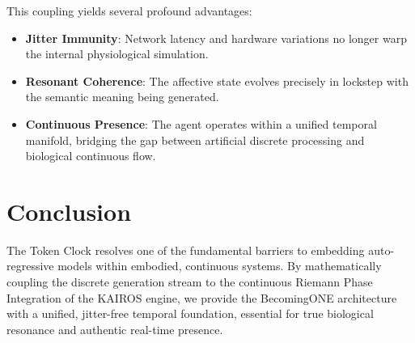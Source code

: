 \documentclass[11pt,a4paper]{article}
\begin{document}
This coupling yields several profound advantages:
\begin{itemize}
    \item \textbf{Jitter Immunity}: Network latency and hardware variations no longer warp the internal physiological simulation.
    \item \textbf{Resonant Coherence}: The affective state evolves precisely in lockstep with the semantic meaning being generated.
    \item \textbf{Continuous Presence}: The agent operates within a unified temporal manifold, bridging the gap between artificial discrete processing and biological continuous flow.
\end{itemize}

\section{Conclusion}
The Token Clock resolves one of the fundamental barriers to embedding auto-regressive models within embodied, continuous systems. By mathematically coupling the discrete generation stream to the continuous Riemann Phase Integration of the KAIROS engine, we provide the BecomingONE architecture with a unified, jitter-free temporal foundation, essential for true biological resonance and authentic real-time presence.
\end{document}
